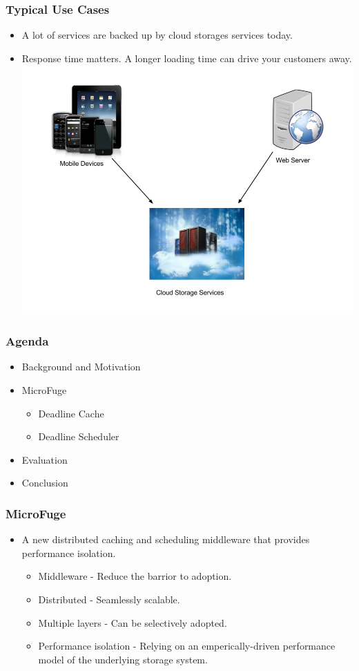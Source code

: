 \documentclass{beamer}
\begin{document}
\begin{frame}
  \frametitle{Typical Use Cases}
  \begin{itemize}
  \item A lot of services are backed up by cloud storages services today.
  \item Response time matters. A longer loading time can drive your customers away.
    \includegraphics[scale=0.26]{img/A_Cloud_Example.png}
  \end{itemize}
\end{frame}


\begin{frame}
  \frametitle{Agenda}
  \begin{itemize}
  \item[\Checkmark] Background and Motivation
  \item MicroFuge
    \begin{itemize}
    \item Deadline Cache
    \item Deadline Scheduler
    \end{itemize}
  \item Evaluation
  \item Conclusion
  \end{itemize}
\end{frame}

\begin{frame}
  \frametitle{MicroFuge}
  \begin{itemize}
    \item A new distributed caching and scheduling middleware that provides performance isolation.
      \begin{itemize}
      \item Middleware - Reduce the barrior to adoption.
      \item Distributed - Seamlessly scalable.
      \item Multiple layers - Can be selectively adopted.
      \item Performance isolation - Relying on an emperically-driven
        performance model of the underlying storage system.
      \end{itemize}
  \end{itemize}
\end {frame}
\end{document}

